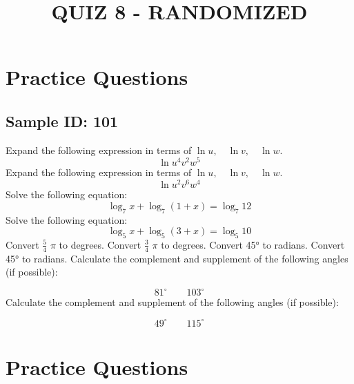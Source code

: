 \documentclass{exam}
\title{QUIZ 8 - RANDOMIZED}
\begin{document}
\section*{Practice Questions}
\subsection*{Sample ID: 101}
\begin{questions}
\question Expand the following expression in terms of $\ln u,\quad \ln v,\quad  \ln w$. \[\ln u^{4}v^{2}w^{5}\] 
\question Expand the following expression in terms of $\ln u,\quad \ln v,\quad  \ln w$. \[\ln u^{2}v^{6}w^{4}\] 
\question Solve the following equation: 
 \[\log_{7}{x}+\log_{7}{\left(1 + x\right)}=\log_{7}{12}\]
\question Solve the following equation: 
 \[\log_{5}{x}+\log_{5}{\left(3 + x\right)}=\log_{5}{10}\]
\newpage
\question Convert $\frac{5}{4}$ $\pi$   to degrees.
\question Convert $\frac{3}{4}$ $\pi$   to degrees.
\question Convert 45° to radians.
\question Convert 45° to radians.
\question Calculate the complement and supplement of the following angles (if possible):
 
                  \[81^{\circ}\quad\quad 103^{\circ}\]\question Calculate the complement and supplement of the following angles (if possible):
 
                  \[49^{\circ}\quad\quad 115^{\circ}\]\end{questions}\newpage
\section*{Practice Questions}
\end{document}
